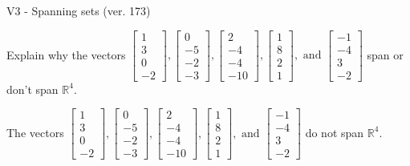 \begin{exercise}
  \begin{exerciseTitle}V3 - Spanning sets (ver. 173)\end{exerciseTitle}
  \begin{exerciseStatement}
    Explain why the vectors \(\left[\begin{array}{r}
1 \\
3 \\
0 \\
-2
\end{array}\right] , \left[\begin{array}{r}
0 \\
-5 \\
-2 \\
-3
\end{array}\right] , \left[\begin{array}{r}
2 \\
-4 \\
-4 \\
-10
\end{array}\right] , \left[\begin{array}{r}
1 \\
8 \\
2 \\
1
\end{array}\right] , \text{ and } \left[\begin{array}{r}
-1 \\
-4 \\
3 \\
-2
\end{array}\right]\) span or don't span \(\mathbb{R}^4\). 
	


  \end{exerciseStatement}
  \begin{exerciseAnswer}
   The vectors \(\left[\begin{array}{r}
1 \\
3 \\
0 \\
-2
\end{array}\right] , \left[\begin{array}{r}
0 \\
-5 \\
-2 \\
-3
\end{array}\right] , \left[\begin{array}{r}
2 \\
-4 \\
-4 \\
-10
\end{array}\right] , \left[\begin{array}{r}
1 \\
8 \\
2 \\
1
\end{array}\right] , \text{ and } \left[\begin{array}{r}
-1 \\
-4 \\
3 \\
-2
\end{array}\right]\) 
  	 do not  
	span \(\mathbb{R}^4\).
  



\end{exerciseAnswer}
\end{exercise}
